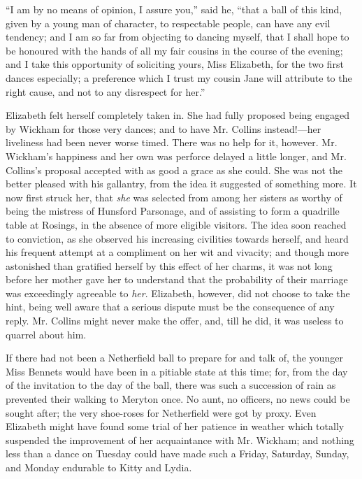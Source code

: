 \documentclass[12pt,openright]{book}
\begin{document}
“I am by no means of opinion, I assure you,” said he, “that a ball of this kind, given by a young man of character, to respectable people, can have any evil tendency; and I am so far from objecting to dancing myself, that I shall hope to be honoured with the hands of all my fair cousins in the course of the evening; and I take this opportunity of soliciting yours, Miss Elizabeth, for the two first dances especially; a preference which I trust my cousin Jane will attribute to the right cause, and not to any disrespect for her.”

Elizabeth felt herself completely taken in. She had fully proposed being engaged by Wickham for those very dances; and to have Mr. Collins instead!—her liveliness had been never worse timed. There was no help for it, however. Mr. Wickham’s happiness and her own was perforce delayed a little longer, and Mr. Collins’s proposal accepted with as good a grace as she could. She was not the better pleased with his gallantry, from the idea it suggested of something more. It now first struck her, that \textit{she} was selected from among her sisters as worthy of being the mistress of Hunsford Parsonage, and of assisting to form a quadrille table at Rosings, in the absence of more eligible visitors. The idea soon reached to conviction, as she observed his increasing civilities towards herself, and heard his frequent attempt at a compliment on her wit and vivacity; and though more astonished than gratified herself by this effect of her charms, it was not long before her mother gave her to understand that the probability of their marriage was exceedingly agreeable to \textit{her}. Elizabeth, however, did not choose to take the hint, being well aware that a serious dispute must be the consequence of any reply. Mr. Collins might never make the offer, and, till he did, it was useless to quarrel about him.

If there had not been a Netherfield ball to prepare for and talk of, the younger Miss Bennets would have been in a pitiable state at this time; for, from the day of the invitation to the day of the ball, there was such a succession of rain as prevented their walking to Meryton once. No aunt, no officers, no news could be sought after; the very shoe-roses for Netherfield were got by proxy. Even Elizabeth might have found some trial of her patience in weather which totally suspended the improvement of her acquaintance with Mr. Wickham; and nothing less than a dance on Tuesday could have made such a Friday, Saturday, Sunday, and Monday endurable to Kitty and Lydia.
\end{document}
